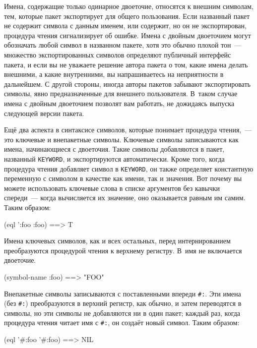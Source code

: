 Имена, содержащие только одинарное двоеточие, относятся к внешним символам, тем, которые
пакет экспортирует для общего пользования. Если названный пакет не содержит символа с
данным именем, или содержит, но он не экспортирован, процедура чтения сигнализирует об
ошибке. Имена с двойным двоеточием могут обозначать любой символ в названном пакете, хотя
это обычно плохой тон~--- множество экспортированных символов определяют публичный
интерфейс пакета, и если вы не уважаете решение автора пакета о том, какие имена делать
внешними, а какие внутренними, вы напрашиваетесь на неприятности в дальнейшем. С другой
стороны, иногда авторы пакетов забывают экспортировать символы, явно предназначенные для
внешнего пользователя. В~таком случае имена с двойным двоеточием позволят вам работать, не
дожидаясь выпуска следующей версии пакета.

Ещё два аспекта в синтаксисе символов, которые понимает процедура чтения,~--- это ключевые и
внепакетные символы. Ключевые символы записываются как имена, начинающиеся с
двоеточия. Такие символы добавляются в пакет, названный \lstinline{KEYWORD}, и экспортируются
автоматически. Кроме того, когда процедура чтения добавляет символ в \lstinline{KEYWORD}, он также
определяет константную переменную с символом в качестве как имени, так и значения. Вот
почему вы можете использовать ключевые слова в списке аргументов без кавычки спереди~---
когда вычисляется их значение, оно оказывается равным им самим.  Таким образом:

\begin{myverb}
(eql ':foo :foo) ==> T
\end{myverb}

Имена ключевых символов, как и всех остальных, перед интернированием преобразуются
процедурой чтения к верхнему регистру. В~имя не включается двоеточие.

\begin{myverb}
(symbol-name :foo) ==> "FOO"
\end{myverb}

Внепакетные символы записываются с поставленными впереди \lstinline!#:!. Эти имена (без
\lstinline!#:!) преобразуются в верхний регистр, как обычно, и затем переводятся в
символы, но эти символы не добавляются ни в один пакет; каждый раз, когда процедура чтения
читает имя с \lstinline!#:!, он создаёт новый символ.  Таким образом:

\begin{myverb}
(eql '#:foo '#:foo) ==> NIL
\end{myverb}

